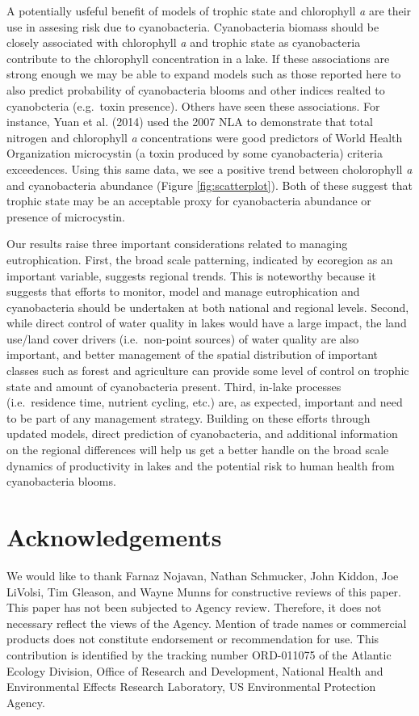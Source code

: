 \documentclass[11pt,]{article}
\begin{document}
A potentially usfeful benefit of models of trophic state and chlorophyll
\emph{a} are their use in assesing risk due to cyanobacteria.
Cyanobacteria biomass should be closely associated with chlorophyll
\emph{a} and trophic state as cyanobacteria contribute to the
chlorophyll concentration in a lake. If these associations are strong
enough we may be able to expand models such as those reported here to
also predict probability of cyanobacteria blooms and other indices
realted to cyanobcteria (e.g.~toxin presence). Others have seen these
associations. For instance, Yuan et al. (2014) used the 2007 NLA to
demonstrate that total nitrogen and chlorophyll \emph{a} concentrations
were good predictors of World Health Organization microcystin (a toxin
produced by some cyanobacteria) criteria exceedences. Using this same
data, we see a positive trend between cholorophyll \emph{a} and
cyanobacteria abundance (Figure \ref{fig:scatterplot}). Both of these
suggest that trophic state may be an acceptable proxy for cyanobacteria
abundance or presence of microcystin.

Our results raise three important considerations related to managing
eutrophication. First, the broad scale patterning, indicated by
ecoregion as an important variable, suggests regional trends. This is
noteworthy because it suggests that efforts to monitor, model and manage
eutrophication and cyanobacteria should be undertaken at both national
and regional levels. Second, while direct control of water quality in
lakes would have a large impact, the land use/land cover drivers
(i.e.~non-point sources) of water quality are also important, and better
management of the spatial distribution of important classes such as
forest and agriculture can provide some level of control on trophic
state and amount of cyanobacteria present. Third, in-lake processes
(i.e.~residence time, nutrient cycling, etc.) are, as expected,
important and need to be part of any management strategy. Building on
these efforts through updated models, direct prediction of
cyanobacteria, and additional information on the regional differences
will help us get a better handle on the broad scale dynamics of
productivity in lakes and the potential risk to human health from
cyanobacteria blooms.

\section{Acknowledgements}\label{acknowledgements}

We would like to thank Farnaz Nojavan, Nathan Schmucker, John Kiddon,
Joe LiVolsi, Tim Gleason, and Wayne Munns for constructive reviews of
this paper. This paper has not been subjected to Agency review.
Therefore, it does not necessary reflect the views of the Agency.
Mention of trade names or commercial products does not constitute
endorsement or recommendation for use. This contribution is identified
by the tracking number ORD-011075 of the Atlantic Ecology Division,
Office of Research and Development, National Health and Environmental
Effects Research Laboratory, US Environmental Protection Agency.
\end{document}
